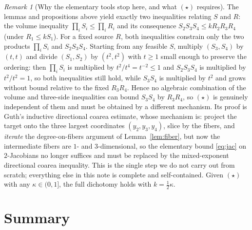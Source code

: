 \documentclass[11pt]{article}
\theoremstyle{remark}
\newtheorem{remark}{Remark}
\begin{document}
\begin{remark}[Why the elementary tools stop here, and what $(\star)$ requires]
\label{rem:gap}
The lemmas and propositions above yield exactly two inequalities relating $S$ and $R$: the
volume inequality $\prod_iS_i\le\prod_iR_i$ and its consequence $S_2S_3S_4\le kR_2R_3R_4$
(under $R_1\le kS_1$). For a fixed source $R$, both inequalities constrain only the two
products $\prod_iS_i$ and $S_2S_3S_4$. Starting from any feasible $S$, multiply
$(S_3,S_4)$ by $(t,t)$ and divide $(S_1,S_2)$ by $(t^2,t^2)$ with $t\ge1$ small enough to
preserve the ordering: then $\prod_iS_i$ is multiplied by $t^{2}/t^{4}=t^{-2}\le1$ and
$S_2S_3S_4$ is multiplied by $t^{2}/t^{2}=1$, so both inequalities still hold, while
$S_3S_4$ is multiplied by $t^{2}$ and grows without bound relative to the fixed $R_3R_4$. Hence no algebraic combination of
the volume and three-side inequalities can bound $S_3S_4$ by $R_3R_4$, so $(\star)$ is
genuinely independent of them and must be obtained by a different mechanism. Its proof is Guth's inductive directional
coarea estimate, whose mechanism is: project the target onto the three largest coordinates
$(y_2,y_3,y_4)$, slice by the fibers, and \emph{iterate} the degree-on-fibers argument of
Lemma~\ref{lem:fiber}, but now the intermediate fibers are $1$- and $3$-dimensional, so the
elementary bound \eqref{eq:jac} on $2$-Jacobians no longer suffices and must be replaced by
the mixed-exponent directional coarea inequality. This is the single step we do not carry
out from scratch; everything else in this note is complete and self-contained. Given
$(\star)$ with any $\kappa\in(0,1]$, the full dichotomy holds with $k=\tfrac12\kappa$.
\end{remark}

\section{Summary}
\end{document}

